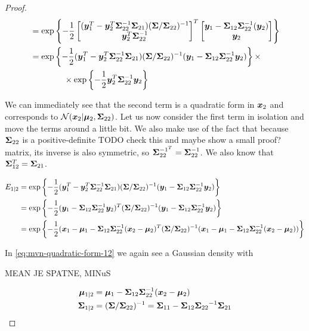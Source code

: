 \begin{proof}
\begin{align}
        &= \exp \left\lbrace -\frac{1}{2}
        \begin{bmatrix} ({\bm{y}}_1^T - {\bm{y}}_2^T {\bm{\Sigma}}_{22}^{-1} {\bm{\Sigma}}_{21}) ({\bm{\Sigma}}/{\bm{\Sigma}}_{22})^{-1} \\
        {\bm{y}}_2^T {\bm{\Sigma}}_{22}^{-1}
        \end{bmatrix}^T
        \begin{bmatrix} {\bm{y}}_1 -{\bm{\Sigma}}_{12} {\bm{\Sigma}}_{22}^{-1} ({\bm{y}}_2) \\ {\bm{y}}_2 \end{bmatrix}
        \right\rbrace \\
        &= \exp \left\lbrace -\frac{1}{2}
        ({\bm{y}}_1^T - {\bm{y}}_2^T {\bm{\Sigma}}_{22}^{-1} {\bm{\Sigma}}_{21}) ({\bm{\Sigma}}/{\bm{\Sigma}}_{22})^{-1} ({\bm{y}}_1 -{\bm{\Sigma}}_{12} {\bm{\Sigma}}_{22}^{-1} {\bm{y}}_2)
        \right\rbrace \times \\
        & \qquad\qquad \times \exp \left\lbrace -\frac{1}{2} {\bm{y}}_2^T {\bm{\Sigma}}_{22}^{-1} {\bm{y}}_2 \right\rbrace \nonumber
    \end{align}

    We can immediately see that the second term is a quadratic form in ${\bm{x}}_2$
    and corresponds to ${\mathcal{N}}({\bm{x}}_2 | {\bm{\mu}}_2, {\bm{\Sigma}}_{22})$. Let us now consider
    the first term in isolation and move the terms around a little bit. We also
    make use of the fact that because ${\bm{\Sigma}}_{22}$ is a positive-definite
    {TODO check this and maybe show a small proof?} matrix, its inverse is also
    symmetric, so ${\bm{\Sigma}}^{-1^T}_{22} = {\bm{\Sigma}}^{-1}_{22}$. We also know that
    ${\bm{\Sigma}}^T_{12} = {\bm{\Sigma}}_{21}$.

    \begin{align}
        E_{1|2} &= \exp \left\lbrace -\frac{1}{2}
        ({\bm{y}}_1^T - {\bm{y}}_2^T {\bm{\Sigma}}_{22}^{-1} {\bm{\Sigma}}_{21}) ({\bm{\Sigma}}/{\bm{\Sigma}}_{22})^{-1} ({\bm{y}}_1 -{\bm{\Sigma}}_{12} {\bm{\Sigma}}_{22}^{-1} {\bm{y}}_2) \right\rbrace \\
        &= \exp \left\lbrace -\frac{1}{2}
        ({\bm{y}}_1 - {\bm{\Sigma}}_{12}{\bm{\Sigma}}_{22}^{-1} {\bm{y}}_2)^T ({\bm{\Sigma}}/{\bm{\Sigma}}_{22})^{-1} ({\bm{y}}_1 -{\bm{\Sigma}}_{12} {\bm{\Sigma}}_{22}^{-1} {\bm{y}}_2) \right\rbrace \\
        &= \exp \left\lbrace -\frac{1}{2}
        ({\bm{x}}_1 - {\bm{\mu}}_1 - {\bm{\Sigma}}_{12}{\bm{\Sigma}}_{22}^{-1} ({\bm{x}}_2 - {\bm{\mu}}_2)^T ({\bm{\Sigma}}/{\bm{\Sigma}}_{22})^{-1} ({\bm{x}}_1 - {\bm{\mu}}_1 -{\bm{\Sigma}}_{12} {\bm{\Sigma}}_{22}^{-1} ({\bm{x}}_2 - {\bm{\mu}}_2)) \right\rbrace \label{eq:mvn-quadratic-form-12}
    \end{align}

    In \eqref{eq:mvn-quadratic-form-12} we again see a Gaussian density with

    MEAN JE SPATNE, MINuS

    \begin{align}
        {\bm{\mu}}_{1|2} &= {\bm{\mu}}_1 - {\bm{\Sigma}}_{12}{\bm{\Sigma}}_{22}^{-1} ({\bm{x}}_2 - {\bm{\mu}}_2) \\
        {\bm{\Sigma}}_{1|2} &= ({\bm{\Sigma}}/{\bm{\Sigma}}_{22})^{-1} =  {{\bm{\Sigma}}_{11}} - {{\bm{\Sigma}}_{12}} {{\bm{\Sigma}}_{22}}^{-1} {{\bm{\Sigma}}_{21}}
    \end{align}
\end{proof}



